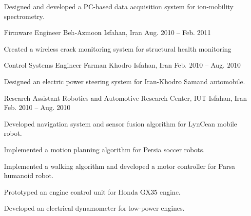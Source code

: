 \begin{cventries}
{\begin{cvitems}
        \item Designed and developed a PC-based data acquisition system for ion-mobility spectrometry.
      \end{cvitems}
    }
  \cventry
    {Firmware Engineer}
    {Beh-Azmoon}
    {Isfahan, Iran}
    {Aug. 2010 -- Feb. 2011}
    {
      \begin{cvitems}
        \item Created a wireless crack monitoring system for structural health monitoring %
      \end{cvitems}
    }
  \cventry
    {Control Systems Engineer}
    {Farman Khodro}
    {Isfahan, Iran}
    {Feb. 2010 -- Aug. 2010}
    {
      \begin{cvitems}
        \item Designed an electric power steering system for Iran-Khodro Samand automobile.
      \end{cvitems}
    }
  \cventry
    {Research Assistant}
    {Robotics and Automotive Research Center, IUT}
    {Isfahan, Iran}
    {Feb. 2010 -- Aug. 2010}
    {
      \begin{cvitems}
        \item Developed navigation system and sensor fusion algorithm for LynCean mobile robot.
        \item Implemented a motion planning algorithm for Persia soccer robots.
        \item Implemented a walking algorithm and developed a motor controller for Parsa humanoid robot.
        \item Prototyped an engine control unit for Honda GX35 engine.
        \item Developed an electrical dynamometer for low-power engines.
      \end{cvitems}
    }
\end{cventries}